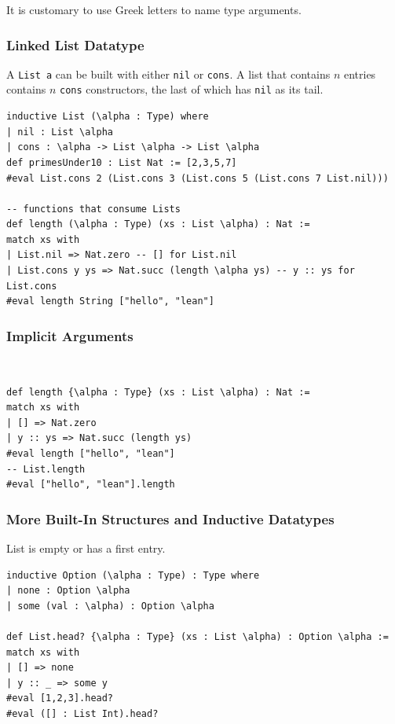 \documentclass{article}
\begin{document}
\begin{remark}
    It is customary to use Greek letters to name type arguments.
\end{remark}

\subsubsection{Linked List Datatype}
\begin{definition}[List]
    A \verb|List a| can be built with either \verb|nil| or \verb|cons|.
    A list that contains $n$ entries contains $n$ \verb|cons| constructors, the last of which has \verb|nil| as its tail.
    \begin{verbatim}
inductive List (\alpha : Type) where
| nil : List \alpha
| cons : \alpha -> List \alpha -> List \alpha
def primesUnder10 : List Nat := [2,3,5,7]
#eval List.cons 2 (List.cons 3 (List.cons 5 (List.cons 7 List.nil)))

-- functions that consume Lists
def length (\alpha : Type) (xs : List \alpha) : Nat :=
match xs with
| List.nil => Nat.zero -- [] for List.nil
| List.cons y ys => Nat.succ (length \alpha ys) -- y :: ys for List.cons
#eval length String ["hello", "lean"]
\end{verbatim}
\end{definition}

\subsubsection{Implicit Arguments}
\begin{definition}~
    \begin{verbatim}
def length {\alpha : Type} (xs : List \alpha) : Nat :=
match xs with
| [] => Nat.zero
| y :: ys => Nat.succ (length ys)
#eval length ["hello", "lean"]
-- List.length
#eval ["hello", "lean"].length
\end{verbatim}
\end{definition}

\subsubsection{More Built-In Structures and Inductive Datatypes}
\begin{definition}[option]
    List is empty or has a first entry.
    \begin{verbatim}
inductive Option (\alpha : Type) : Type where
| none : Option \alpha
| some (val : \alpha) : Option \alpha

def List.head? {\alpha : Type} (xs : List \alpha) : Option \alpha :=
match xs with
| [] => none
| y :: _ => some y
#eval [1,2,3].head?
#eval ([] : List Int).head?
\end{verbatim}
\end{definition}
\end{document}
